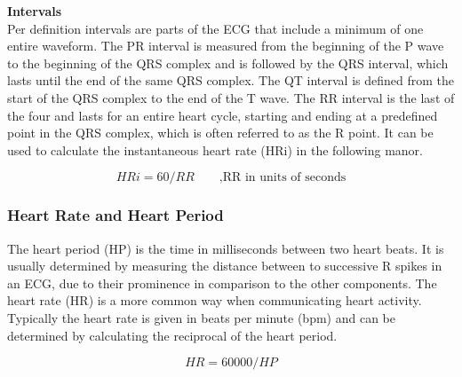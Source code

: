 \textbf{Intervals}\\
 Per definition intervals are parts of the ECG that include a minimum of one entire waveform. The PR interval is measured from the beginning of the P wave to the beginning of the QRS complex and is followed by the QRS interval, which lasts until the end of the same QRS complex. The QT interval is defined from the start of the QRS complex to the end of the T wave. The RR interval is the last of the four and lasts for an entire heart cycle, starting and ending at a predefined point in the QRS complex, which is often referred to as the R point. It can be used to calculate the instantaneous heart rate (HRi) in the following manor.

\begin{equation}\label{instaHR}
HRi = 60 / RR \qquad \text{,RR in units of seconds}	
\end{equation}

\subsubsection{Heart Rate and Heart Period}
The heart period (HP) is the time in milliseconds between two heart beats. It is usually determined by measuring the distance between to successive R spikes in an ECG, due to their prominence in comparison to the other components. The heart rate (HR) is a more common way when communicating heart activity. Typically the heart rate is given in beats per minute (bpm) and can be determined by calculating the reciprocal of the heart period.

\begin{equation}
HR = 60000 / HP
\end{equation}

